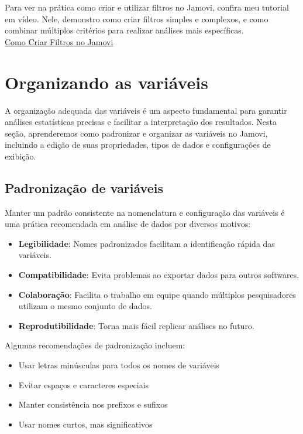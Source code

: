 \begin{tcolorbox}[colback=white,colframe=red,title={\faPlayCircle \ Dica de Conteúdo}]
  Para ver na prática como criar e utilizar filtros no Jamovi, confira meu tutorial em vídeo. Nele, demonstro como criar filtros simples e complexos, e como combinar múltiplos critérios para realizar análises mais específicas.\\
  \textcolor{red}{\faYoutube} \href{https://youtu.be/U6sFx7vQhdc?si=rpdJF2qgNyWCO11a}{Como Criar Filtros no Jamovi}
\end{tcolorbox}


\section{Organizando as variáveis}

A organização adequada das variáveis é um aspecto fundamental para garantir análises estatísticas precisas e facilitar a interpretação dos resultados. Nesta seção, aprenderemos como padronizar e organizar as variáveis no Jamovi, incluindo a edição de suas propriedades, tipos de dados e configurações de exibição.

\subsection{Padronização de variáveis}

Manter um padrão consistente na nomenclatura e configuração das variáveis é uma prática recomendada em análise de dados por diversos motivos:

\begin{itemize}
    \item \textbf{Legibilidade}: Nomes padronizados facilitam a identificação rápida das variáveis.
    \item \textbf{Compatibilidade}: Evita problemas ao exportar dados para outros softwares.
    \item \textbf{Colaboração}: Facilita o trabalho em equipe quando múltiplos pesquisadores utilizam o mesmo conjunto de dados.
    \item \textbf{Reprodutibilidade}: Torna mais fácil replicar análises no futuro.
\end{itemize}

Algumas recomendações de padronização incluem:
\begin{itemize}
    \item Usar letras minúsculas para todos os nomes de variáveis
    \item Evitar espaços e caracteres especiais
    \item Manter consistência nos prefixos e sufixos
    \item Usar nomes curtos, mas significativos
\end{itemize}

